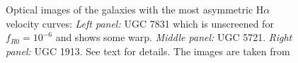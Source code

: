 \documentclass[useAMS,usenatbib,twocolumn]{mn2e}
\newcommand{\ha}{H$\alpha$}
\begin{document}
\begin{figure}
\caption{Optical images of the galaxies with the most asymmetric \ha~
velocity curves: {\it Left panel:} 
UGC 7831 which is unscreened for $f_{R0}=10^{-6}$ and shows some warp.  
{\it Middle panel:} UGC 5721. {\it Right panel:} UGC 1913. See text for details.
The images are taken from \citet{figgs2008}
\label{fig:eg-image-2}}
\end{figure}
\end{document}
